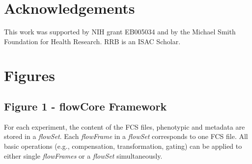 \documentclass[10pt]{bmc_article}
\newcommand{\Rclass}[1]{{\textit{#1}}}
\newenvironment{bmcformat}{\begin{raggedright}\baselineskip20pt\sloppy\setboolean{publ}{false}}{\end{raggedright}\baselineskip20pt\sloppy}
\begin{document}
\begin{bmcformat}
    

\section*{Acknowledgements}
  This work was supported by NIH grant EB005034 and by the Michael Smith
Foundation for Health Research. RRB is an ISAC Scholar.



 


{
   }     %





\section*{Figures}
  \subsection*{Figure 1 - flowCore Framework}
 \label{fig1:FrameWork}For each experiment, the content of
        the FCS files, phenotypic and metadata are stored in a
        \Rclass{flowSet}. Each \Rclass{flowFrame} in a \Rclass{flowSet}
        corresponds to one FCS file. All basic operations (e.g.,
        compensation, transformation, gating) can be applied to either
        single \Rclass{flowFrames} or a \Rclass{flowSet} simultaneously.


\end{bmcformat}
\end{document}
